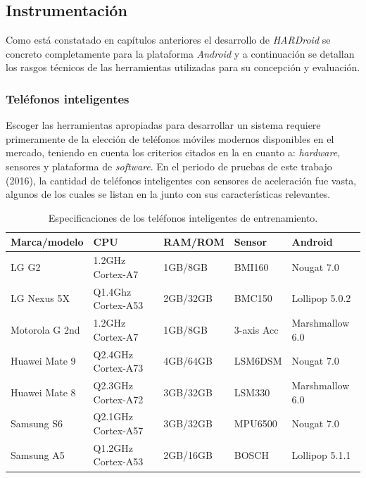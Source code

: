 \subsection{Instrumentación}

Como está constatado en capítulos anteriores el desarrollo de \emph{HARDroid
}se concreto completamente para la plataforma \emph{Android }y a continuación
se detallan los rasgos técnicos de las herramientas utilizadas para
su concepción y evaluación.

\subsubsection{Teléfonos inteligentes}

Escoger las herramientas apropiadas para desarrollar un sistema 
requiere primeramente de la elección de teléfonos móviles modernos
disponibles en el mercado, teniendo en cuenta los criterios citados
en la  en cuanto a: \emph{hardware},
sensores y plataforma de \emph{software}. En el periodo de pruebas
de este trabajo (2016), la cantidad de teléfonos inteligentes con
sensores de aceleración fue vasta, algunos de los cuales se listan
en la  junto con sus características relevantes.

\begin{table}[h]
\begin{centering}
\begin{tabular}{|l|>{\raggedright}p{2.5cm}|l|>{\raggedright}p{2cm}|l|}
\hline 
Marca/modelo & CPU & RAM/ROM & Sensor & Android\tabularnewline
\hline 
\hline 
LG G2 & 1.2GHz Cortex-A7 & 1GB/8GB & BMI160 & Nougat 7.0\tabularnewline
\hline 
LG Nexus 5X & Q1.4Ghz Cortex-A53 & 2GB/32GB & BMC150 & Lollipop 5.0.2\tabularnewline
\hline 
Motorola G 2nd & 1.2GHz Cortex-A7 & 1GB/8GB & 3-axis Acc & Marshmallow 6.0\tabularnewline
\hline 
Huawei Mate 9 & Q2.4GHz Cortex-A73 & 4GB/64GB & LSM6DSM & Nougat 7.0\tabularnewline
\hline 
Huawei Mate 8 & Q2.3GHz Cortex-A72 & 3GB/32GB & LSM330  & Marshmallow 6.0\tabularnewline
\hline 
Samsung S6 & Q2.1GHz Cortex-A57 & 3GB/32GB & MPU6500 & Nougat 7.0\tabularnewline
\hline 
Samsung A5 & Q1.2GHz Cortex-A53  & 2GB/16GB & BOSCH & Lollipop 5.1.1\tabularnewline
\hline 
\end{tabular}
\par\end{centering}
\caption[Especificaciones de teléfonos inteligentes]{\label{tab6:dispositivos}Especificaciones de los teléfonos inteligentes
de entrenamiento.}
\end{table}

